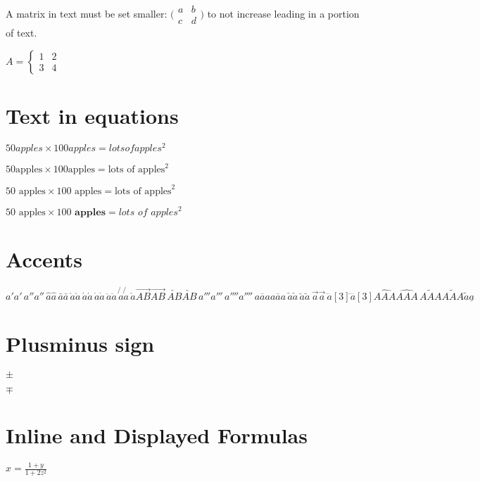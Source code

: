 \documentclass{article}
\begin{document}
A matrix in text must be set smaller:
$\bigl(\begin{smallmatrix}
a&b\\ c&d
\end{smallmatrix} \bigr)$
to not increase leading in a portion of text.

$
A=\begin{cases}
  1 & 2 \\
  3 & 4
\end{cases}
$

\section{Text in equations}

$50 apples \times 100 apples = lots of apples^2$

$50 \text{apples} \times 100 \text{apples}
 = \text{lots of apples}^2$

$50 \text{ apples} \times 100 \text{ apples}
 = \text{lots of apples}^2$

$50 \textrm{ apples} \times 100
 \textbf{ apples} = \textit{lots of apples}^2$


\section{Accents}

$a'	a'\,	a''	a''\,
\hat{a}	\hat{a} \,	\bar{a}	\bar{a} \,
\grave{a}	\grave{a} \,	\acute{a}	\acute{a} \,
\dot{a}	\dot{a} \,	\ddot{a}	\ddot{a} \,
\not{a}	\not{a} \,	\mathring{a}	
\overrightarrow{AB}	\overrightarrow{AB} \,	\overleftarrow{AB}	\overleftarrow{AB} \,
a'''	a'''\,	a''''	a''''\,
\overline{aaa}	\overline{aaa} \,	\check{a}	\check{a} \,
\breve{a}	\breve{a} \,	\vec{a}	\vec{a} \,
\dddot{a}[3]		\ddddot{a}[3]	
\widehat{AAA}	\widehat{AAA} \,	\widetilde{AAA}	\widetilde{AAA}
\tilde{a}	\underline{a}$

\section{Plusminus sign}

$\pm$

$\mp$

 

\section{Inline and Displayed Formulas}

$x=\frac{1+y}{1+2z^2}$
\end{document}
